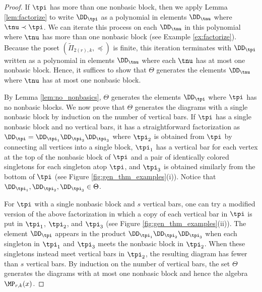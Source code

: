 \begin{proof}
    If $\tpi$ has more than one nonbasic block, then we apply Lemma \ref{lem:factorize} to write $\DD_\tpi$ as a polynomial in elements $\DD_\tnu$ where $\tnu\prec\tpi$. We can iterate this process on each $\DD_\tnu$ in this polynomial where $\tnu$ has more than one nonbasic block (see Example \ref{ex:factorize}). Because the poset $(\tilde\Pi_{2(r),k},\preceq)$ is finite, this iteration terminates with $\DD_\tpi$ written as a polynomial in elements $\DD_\tnu$ where each $\tnu$ has at most one nonbasic block. Hence, it suffices to show that $\Theta$ generates the elements $\DD_\tnu$ where $\tnu$ has at most one nonbasic block.

    By Lemma \ref{lem:no_nonbasics}, $\Theta$ generates the elements $\DD_\tpi$ where $\tpi$ has no nonbasic blocks. We now prove that $\Theta$ generates the diagrams with a single nonbasic block by induction on the number of vertical bars. If $\tpi$ has a single nonbasic block and no vertical bars, it has a straightforward factorization as $\DD_\tpi=\DD_{\tpi_1}\DD_{\tpi_2}\DD_{\tpi_3}$ where $\tpi_2$ is obtained from $\tpi$ by connecting all vertices into a single block, $\tpi_1$ has a vertical bar for each vertex at the top of the nonbasic block of $\tpi$ and a pair of identically colored singletons for each singleton atop $\tpi$, and $\tpi_3$ is obtained similarly from the bottom of $\tpi$ (see Figure \ref{fig:gen_thm_examples}(i)). Notice that $\DD_{\tpi_1},\DD_{\tpi_2},\DD_{\tpi_3}\in\Theta$.

    For $\tpi$ with a single nonbasic block and $s$ vertical bars, one can try a modified version of the above factorization in which a copy of each vertical bar in $\tpi$ is put in $\tpi_1$, $\tpi_2$, and $\tpi_3$ (see Figure \ref{fig:gen_thm_examples}(ii)). The element $\DD_\tpi$ appears in the product $\DD_{\tpi_1}\DD_{\tpi_2}\DD_{\tpi_3}$ when each singleton in $\tpi_1$ and $\tpi_3$ meets the nonbasic block in $\tpi_2$. When these singletons instead meet vertical bars in $\tpi_2$, the resulting diagram has fewer than $s$ vertical bars. By induction on the number of vertical bars, the set $\Theta$ generates the diagrams with at most one nonbasic block and hence the algebra $\MP_{r,k}(x)$.
\end{proof}

